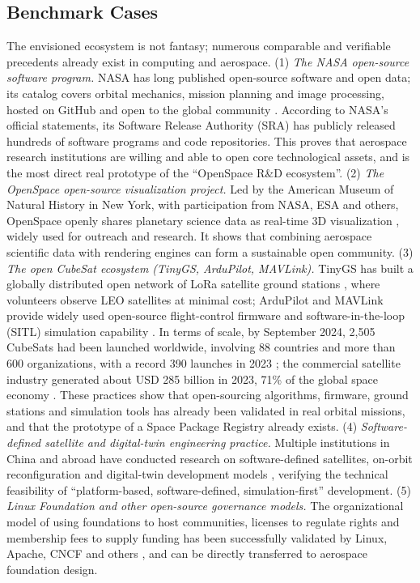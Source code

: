 \documentclass[11pt]{article}
\begin{document}
\subsection{Benchmark Cases}
The envisioned ecosystem is not fantasy; numerous comparable and verifiable precedents already exist in computing and aerospace. (1) \emph{The NASA open-source software program.} NASA has long published open-source software and open data; its catalog covers orbital mechanics, mission planning and image processing, hosted on GitHub and open to the global community \cite{nasa}. According to NASA's official statements, its Software Release Authority (SRA) has publicly released hundreds of software programs and code repositories. This proves that aerospace research institutions are willing and able to open core technological assets, and is the most direct real prototype of the ``OpenSpace R\&D ecosystem''. (2) \emph{The OpenSpace open-source visualization project.} Led by the American Museum of Natural History in New York, with participation from NASA, ESA and others, OpenSpace openly shares planetary science data as real-time 3D visualization \cite{openspace}, widely used for outreach and research. It shows that combining aerospace scientific data with rendering engines can form a sustainable open community. (3) \emph{The open CubeSat ecosystem (TinyGS, ArduPilot, MAVLink).} TinyGS has built a globally distributed open network of LoRa satellite ground stations \cite{tinygs}, where volunteers observe LEO satellites at minimal cost; ArduPilot and MAVLink provide widely used open-source flight-control firmware and software-in-the-loop (SITL) simulation capability \cite{ardupilot,mavlink}. In terms of scale, by September 2024, 2,505 CubeSats had been launched worldwide, involving 88 countries and more than 600 organizations, with a record 390 launches in 2023 \cite{kulu2024}; the commercial satellite industry generated about USD 285 billion in 2023, 71\% of the global space economy \cite{sia2024}. These practices show that open-sourcing algorithms, firmware, ground stations and simulation tools has already been validated in real orbital missions, and that the prototype of a Space Package Registry already exists. (4) \emph{Software-defined satellite and digital-twin engineering practice.} Multiple institutions in China and abroad have conducted research on software-defined satellites, on-orbit reconfiguration and digital-twin development models \cite{xufanjiang2023}, verifying the technical feasibility of ``platform-based, software-defined, simulation-first'' development. (5) \emph{Linux Foundation and other open-source governance models.} The organizational model of using foundations to host communities, licenses to regulate rights and membership fees to supply funding has been successfully validated by Linux, Apache, CNCF and others \cite{fogel2005}, and can be directly transferred to aerospace foundation design.
\end{document}
